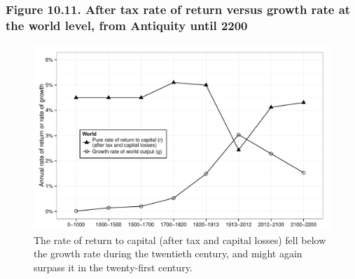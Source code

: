 \documentclass[t]{beamer}\usepackage[]{graphicx}\usepackage[]{color}
\newenvironment{knitrout}{}{} %
\begin{document}
\begin{frame}[label=Figure_10_11]
\frametitle{Figure 10.11. After tax rate of return versus growth rate at the world level, from Antiquity until 2200}
\begin{figure}[t]
\begin{minipage}[b]{\textwidth}
\centering
\begin{knitrout}\footnotesize
{}\color{fgcolor}

{\centering \includegraphics[width=1\linewidth]{figures/bw/Figure_10_11} 

}



\end{knitrout}
\caption{The rate of return to capital (after tax and capital losses) fell below the growth rate during the twentieth century, and might again surpass it in the twenty-first century.}
\end{minipage}
\end{figure}
\end{frame}
\end{document}
